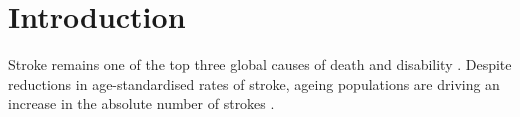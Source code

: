 \section{Introduction}


Stroke remains one of the top three global causes of death and disability \cite{feigin_global_2021}. Despite reductions in age-standardised rates of stroke, ageing populations are driving an increase in the absolute number of strokes \cite{feigin_global_2021}.